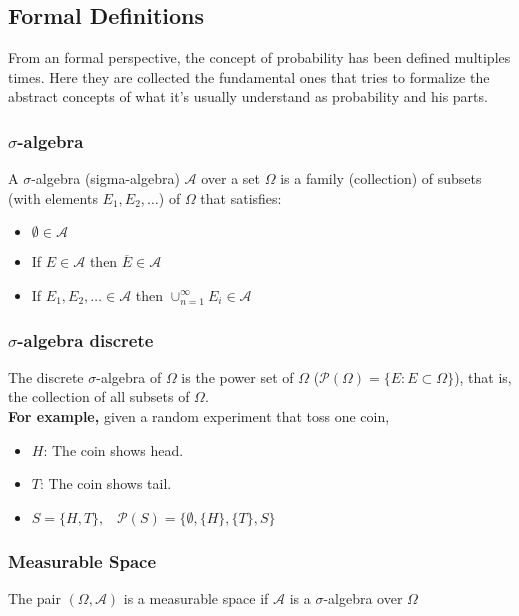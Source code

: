 \subsection{Formal Definitions}
From an formal perspective, the concept of probability has been defined
multiples times. Here they are collected the fundamental ones that tries to
formalize the abstract concepts of what it's usually understand as probability
and his parts.

\subsubsection{$\sigma$-algebra}
A $\sigma$-algebra (sigma-algebra) $\mathcal{A}$ over a set $\Omega$ is a family
(collection) of subsets (with elements $E_1, E_2, \dots$) of $\Omega$ that
satisfies:
\begin{itemize}
    \item $\emptyset \in \mathcal{A}$
    \item If $E \in \mathcal{A}$ then $\overline{E} \in \mathcal{A}$
    \item If $E_1, E_2, \dots \in \mathcal{A}$ then $\cup_{n=1}^{\infty}E_i \in
    \mathcal{A}$ 
\end{itemize} 

\subsubsection{$\sigma$-algebra discrete} 
The discrete $\sigma$-algebra of $\Omega$ is the power set of $\Omega$
($\mathcal{P}(\Omega)=\{E : E \subset \Omega\}$), that is, the collection of all
subsets of $\Omega$.\\

\textbf{For example,} given a random experiment that toss one coin,
\begin{itemize}
    \item[] $H$: The coin shows head.
    \item[] $T$: The coin shows tail. 
    \item[] $S = \{H, T\},\;\;\; \mathcal{P}(S)=\{\emptyset, \{H\}, \{T\}, S\}$
\end{itemize}

\subsubsection{Measurable Space}
The pair $(\Omega, \mathcal{A})$ is a measurable space if $\mathcal{A}$ is a
$\sigma$-algebra over $\Omega$

